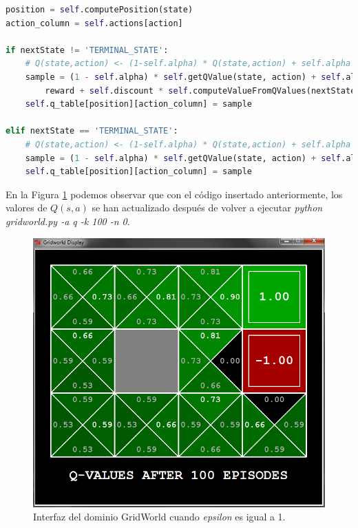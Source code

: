 \documentclass[11pt]{exam}
\begin{document}
\begin{questions}
\begin{lstlisting}[language=Python]
position = self.computePosition(state)
action_column = self.actions[action]

if nextState != 'TERMINAL_STATE':
	# Q(state,action) <- (1-self.alpha) * Q(state,action) + self.alpha * (reward + self.discount * max a' Q(nextState, a'))
	sample = (1 - self.alpha) * self.getQValue(state, action) + self.alpha * (
		reward + self.discount * self.computeValueFromQValues(nextState))
	self.q_table[position][action_column] = sample

elif nextState == 'TERMINAL_STATE':
	# Q(state,action) <- (1-self.alpha) * Q(state,action) + self.alpha * (reward + 0)
	sample = (1 - self.alpha) * self.getQValue(state, action) + self.alpha * (reward + 0)
	self.q_table[position][action_column] = sample
\end{lstlisting}

En la Figura \ref{image_3} podemos observar que con el código insertado anteriormente, los valores de $Q(s,a)$ se han actualizado después de volver a ejecutar \textit{python gridworld.py -a q -k 100 -n 0}.

\begin{figure}[h]
	\centering
	\includegraphics[scale=0.5]{image_3}
	\caption{Interfaz del dominio GridWorld cuando \textit{epsilon} es igual a 1.}
	\label{image_3}
\end{figure}


\end{questions}
\end{document}
